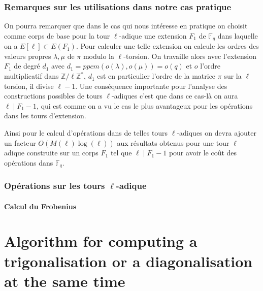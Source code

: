 \documentclass[10pt,a4paper]{book}
\theoremstyle{plain}
\theoremstyle{definition}
\theoremstyle{definition}
\theoremstyle{definition}
\theoremstyle{definition}
\theoremstyle{remark}
\theoremstyle{remark}
\theoremstyle{definition}
\begin{document}
\subsubsection{Remarques sur les utilisations dans notre cas pratique}
On pourra remarquer que dans le cas qui nous intéresse en pratique on choisit comme corps de base pour la tour $\ell$-adique une extension $F_1$ de $\mathbb{F}_q$ dans laquelle on a $E[\ell] \subset E(F_1)$. Pour calculer une telle extension on calcule les ordres des valeurs propres $\lambda, \mu$ de $\pi$ modulo la $\ell$-torsion. On travaille alors avec l'extension $F_1$ de degré $d_1$ avec $d_1=ppcm(o(\lambda),o(\mu))=o(q)$ et $o$ l'ordre multiplicatif dans $\mathbb{Z}/\ell\mathbb{Z}^*$, $d_1$ est en particulier l'ordre de la matrice $\pi$ sur la $\ell$ torsion, il divise $\ell-1$. Une conséquence importante pour l'analyse des constructions possibles de tours $\ell$-adiques c'est que dans ce cas-là on aura $\ell \mid F_1-1$, qui est comme on a vu le cas le plus avantageux pour les opérations dans les tours d'extension. 

Ainsi pour le calcul d'opérations dans de telles tours $\ell$-adiques on devra ajouter un facteur $O(M(\ell)\log(\ell))$ aux résultats obtenus pour une tour $\ell$ adique construite sur un corps $F_1$ tel que $\ell \mid F_1-1$ pour avoir le coût des opérations dans $\mathbb{F}_q$.


\subsubsection{Opérations sur les tours $\ell$-adique}


\paragraph{Calcul du Frobenius}








\appendix
\section{Algorithm for computing a trigonalisation or a diagonalisation at the same time}
\end{document}
